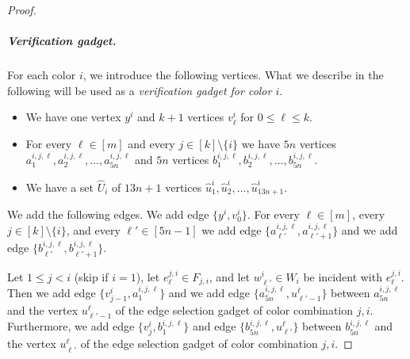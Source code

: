 \documentclass[a4paper,UKenglish,cleveref, autoref, thm-restate, anonymous]{lipics-v2021}
\begin{document}
\begin{proof}
    
    \subparagraph{Verification gadget.} For each color $i$, we introduce the following vertices. What we describe in the following will be used as a \emph{verification gadget for color $i$}.
    \begin{itemize}
        \item We have one vertex $y^i$ and $k+1$ vertices $v^i_\ell$ for $0\le \ell\le k$.
        \item For every $\ell\in[m]$ and every $j\in[k]\setminus\{i\}$ we have $5n$ vertices $a^{i,j,\ell}_1,a^{i,j,\ell}_2,\ldots,a^{i,j,\ell}_{5n}$ and $5n$ vertices $b^{i,j,\ell}_1,b^{i,j,\ell}_2,\ldots,b^{i,j,\ell}_{5n}$.
        \item We have a set $\hat{U}_i$ of $13n+1$ vertices $\hat{u}^i_1,\hat{u}^i_2,\ldots,\hat{u}^i_{13n+1}$.
    \end{itemize}
    We add the following edges. We add edge $\{y^i,v^i_0\}$.
    For every $\ell\in[m]$, every $j\in[k]\setminus\{i\}$, and every $\ell'\in[5n-1]$ we add edge $\{a^{i,j,\ell}_{\ell'},a^{i,j,\ell}_{\ell'+1}\}$ and we add edge $\{b^{i,j,\ell}_{\ell'},b^{i,j,\ell}_{\ell'+1}\}$.
    
    Let $1\le j<i$ (skip if $i=1$), let $e_\ell^{j,i}\in F_{j,i}$, and let $w^i_{\ell'}\in W_i$ be incident with $e_\ell^{j,i}$. Then we add edge $\{v_{j-1}^i,a^{i,j,\ell}_{1}\}$ and we add edge $\{a^{i,j,\ell}_{5n},u^\ell_{\ell'-1}\}$ between $a^{i,j,\ell}_{5n}$ and the vertex $u^\ell_{\ell'-1}$ of the edge selection gadget of color combination $j,i$.
    Furthermore, we add edge $\{v_{j}^i,b^{i,j,\ell}_{1}\}$ and edge $\{b^{i,j,\ell}_{5n},u^\ell_{\ell'}\}$ between $b^{i,j,\ell}_{5n}$ and the vertex $u^\ell_{\ell'}$ of the edge selection gadget of color combination $j,i$.


\end{proof}
\end{document}
